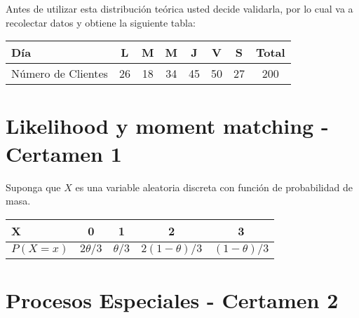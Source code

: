 \documentclass[11pt]{exam}
\begin{document}
\begin{questions}
Antes de utilizar esta distribuci\'on te\'orica usted decide validarla, por lo cual va a recolectar datos y obtiene la siguiente tabla:

\begin{table}[!htbp]
\centering
\begin{tabular}{lccccccc}
\toprule
D\'ia&L&M&M&J&V&S&Total\\
\midrule
N\'umero de Clientes & 26 & 18 & 34 & 45 & 50 & 27 & 200\\
\bottomrule
\end{tabular}
\end{table}



\section*{Likelihood y moment matching - Certamen 1}
\question Suponga que $X$ es una variable aleatoria discreta con funci\'on de probabilidad de masa.

\begin{table}[!htbp]
\centering
\begin{tabular}{lcccc}
\toprule
X&0&1&2&3\\
\midrule
$P(X=x)$ & $2\theta/3$ & $\theta/3$& $2(1-\theta)/3$ & $(1-\theta)/3$\\
\bottomrule
\end{tabular}
\end{table}

\section*{Procesos Especiales - Certamen 2}


\end{questions}
\end{document}
